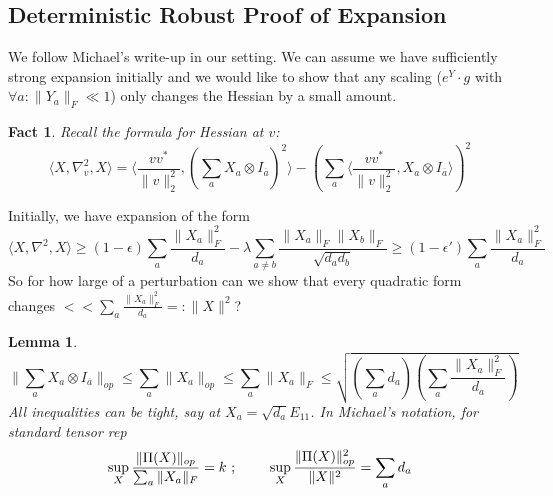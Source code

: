 \documentclass{article}
\newtheorem{lemma}[theorem]{Lemma}
\newtheorem{fact}[theorem]{Fact}
\begin{document}
\subsection{Deterministic Robust Proof of Expansion}

We follow Michael's write-up in our setting. We can assume we have sufficiently strong expansion initially and we would like to show that any scaling ($e^{Y} \cdot g$ with $\forall a: \|Y_{a}\|_{F} \ll 1$) only changes the Hessian by a small amount. 
\begin{fact}
Recall the formula for Hessian at $v$:
\[ \langle X, \nabla_{v}^{2}, X \rangle = \langle \frac{v v^{*}}{\|v\|_{2}^{2}}, \left( \sum_{a} X_{a} \otimes I_{\overline{a}}  \right)^{2} \rangle - \left( \sum_{a} \langle \frac{v v^{*}}{\|v\|_{2}^{2}}, X_{a} \otimes I_{\overline{a}} \rangle  \right)^{2}  \]
\end{fact}

Initially, we have expansion of the form
\[ \langle X, \nabla^{2}, X \rangle \geq (1-\epsilon) \sum_{a} \frac{\|X_{a}\|_{F}^{2}}{d_{a}} - \lambda \sum_{a \neq b} \frac{\|X_{a}\|_{F} \|X_{b}\|_{F}}{\sqrt{d_{a} d_{b}}} \geq (1-\epsilon') \sum_{a} \frac{\|X_{a}\|_{F}^{2}}{d_{a}}   \]
So for how large of a perturbation can we show that every quadratic form changes $<< \sum_{a} \frac{\|X_{a}\|_{F}^{2}}{d_{a}} =: \|X\|^{2}$?  

\begin{lemma}
\[ \|\sum_{a} X_{a} \otimes I_{\overline{a}}\|_{op} \leq \sum_{a} \|X_{a}\|_{op} \leq \sum_{a} \|X_{a}\|_{F} \leq \sqrt{ \left( \sum_{a} d_{a} \right) \left( \sum_{a} \frac{\|X_{a}\|_{F}^{2}}{d_{a}}  \right)} \]
All inequalities can be tight, say at $X_{a} = \sqrt{d_{a}} E_{11}$. In Michael's notation, for standard tensor rep 
\[ \sup_{X} \frac{\|\Pi(X)\|_{op}}{\sum_{a} \|X_{a}\|_{F}} = k  \text{  ;  } \hspace{7mm}
\sup_{X} \frac{\|\Pi(X)\|_{op}^{2}}{\|X\|^{2}} = \sum_{a} d_{a}  \]
\end{lemma}
\end{document}
